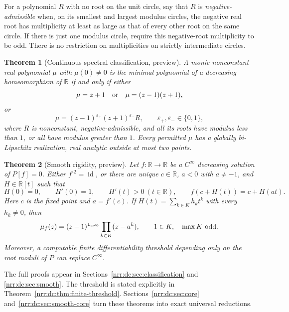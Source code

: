 \documentclass[11pt,letterpaper]{article}
\newtheorem{theorem}{Theorem}[section]
\theoremstyle{definition}
\theoremstyle{remark}
\newcommand{\R}{\mathbb R}
\newcommand{\id}{\operatorname{id}}
\begin{document}
For a polynomial $R$ with no root on the unit circle, say that $R$ is
\emph{negative-admissible} when, on its smallest and largest modulus
circles, the negative real root has multiplicity at least as large as
that of every other root on the same circle. If there is just one
modulus circle, require this negative-root multiplicity to be odd.
There is no restriction on multiplicities on strictly intermediate circles.

\begin{theorem}[Continuous spectral classification, preview]
\label{nrr:dc:thm:main}
A monic nonconstant real polynomial $\mu$ with $\mu(0)\ne0$ is the minimal
polynomial of a decreasing homeomorphism of $\R$ if and only if either
\[
 \mu=z+1\quad\hbox{or}\quad\mu=(z-1)(z+1),
\]
or
\begin{equation}
 \mu=(z-1)^{\varepsilon_+}(z+1)^{\varepsilon_-}R,
 \qquad \varepsilon_+,\varepsilon_-\in\{0,1\},
 \label{nrr:dc:eq:main-form}
\end{equation}
where $R$ is nonconstant, negative-admissible, and all its roots have
modulus less than $1$, or all have modulus greater than $1$.
Every permitted $\mu$ has a globally bi-Lipschitz realization, real
analytic outside at most two points.
\end{theorem}

\begin{theorem}[Smooth rigidity, preview]
\label{nrr:dc:thm:smooth}
Let $f:\R\to\R$ be a $C^\infty$ decreasing solution of $P[f]=0$.
Either $f^{\circ2}=\id$, or there are unique $c\in\R$, $a<0$ with
$a\ne-1$, and $H\in\R[t]$ such that
\begin{equation}
 H(0)=0,\qquad H'(0)=1,\qquad H'(t)>0\ (t\in\R),\qquad
 f(c+H(t))=c+H(at).
 \label{nrr:dc:eq:poly-conjugacy}
\end{equation}
Here $c$ is the fixed point and $a=f'(c)$. If
$H(t)=\sum_{k\in K}h_kt^k$ with every $h_k\ne0$, then
\begin{equation}
 \mu_f(z)=(z-1)^{\mathbf1_{c\ne0}}\prod_{k\in K}(z-a^k),
 \qquad 1\in K,\quad \max K\ \hbox{odd}.
 \label{nrr:dc:eq:smooth-spectrum}
\end{equation}
Moreover, a computable finite differentiability threshold depending only
on the root moduli of $P$ can replace $C^\infty$.
\end{theorem}

The full proofs appear in Sections~\ref{nrr:dc:sec:classification} and
\ref{nrr:dc:sec:smooth}. The threshold is stated explicitly in
Theorem~\ref{nrr:dc:thm:finite-threshold}. Sections~\ref{nrr:dc:sec:core}
and~\ref{nrr:dc:sec:smooth-core} turn these theorems into exact universal
reductions.
\end{document}
